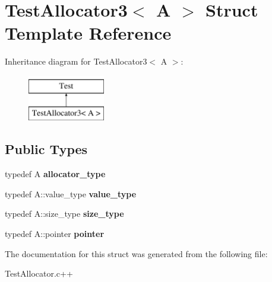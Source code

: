 \hypertarget{structTestAllocator3}{\section{Test\-Allocator3$<$ A $>$ Struct Template Reference}
\label{structTestAllocator3}
}
Inheritance diagram for Test\-Allocator3$<$ A $>$\-:\begin{figure}[H]
\begin{center}
\leavevmode
\includegraphics[height=2.000000cm]{structTestAllocator3}
\end{center}
\end{figure}
\subsection*{Public Types}
\begin{DoxyCompactItemize}
\item 
\hypertarget{structTestAllocator3_a2cbf292b14532b741aa9c2d29603cecd}{typedef A {\bfseries allocator\-\_\-type}}\label{structTestAllocator3_a2cbf292b14532b741aa9c2d29603cecd}

\item 
\hypertarget{structTestAllocator3_ac5054dfad63609102029f3bda09f70fc}{typedef A\-::value\-\_\-type {\bfseries value\-\_\-type}}\label{structTestAllocator3_ac5054dfad63609102029f3bda09f70fc}

\item 
\hypertarget{structTestAllocator3_a123816b6d7f35344795ee12a478658d8}{typedef A\-::size\-\_\-type {\bfseries size\-\_\-type}}\label{structTestAllocator3_a123816b6d7f35344795ee12a478658d8}

\item 
\hypertarget{structTestAllocator3_a1e00e0a73b38d61279e77535325b2124}{typedef A\-::pointer {\bfseries pointer}}\label{structTestAllocator3_a1e00e0a73b38d61279e77535325b2124}

\end{DoxyCompactItemize}


The documentation for this struct was generated from the following file\-:\begin{DoxyCompactItemize}
\item 
Test\-Allocator.\-c++\end{DoxyCompactItemize}

